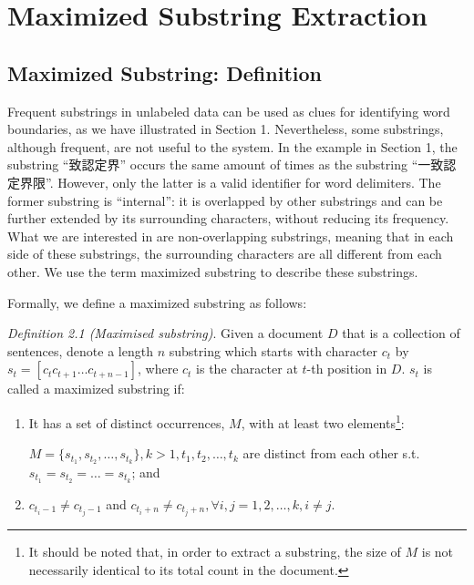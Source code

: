 \documentclass[english]{jnlp_1.4}
\begin{document}
\section{Maximized Substring Extraction}

\subsection{Maximized Substring: Definition}

Frequent substrings in unlabeled data can be used as clues for identifying word boundaries, as we have illustrated in Section 1. Nevertheless, some substrings, although frequent, are not useful to the system. In the example in Section 1, the substring ``致認定界'' occurs the same amount of times as the substring ``一致認定界限''. However, only the latter is a valid identifier for word delimiters. The former substring is ``internal'': it is overlapped by other substrings and can be further extended by its surrounding characters, without reducing its frequency. What we are interested in are non-overlapping substrings, meaning that in each side of these substrings, the surrounding characters are all different from each other. We use the term maximized substring to describe these substrings.

Formally, we define a maximized substring as follows: 

{\it Definition 2.1 (Maximised substring)}. Given a document $D$ that is a collection of sentences, denote a length $\mathit{n}$ substring which starts with character $\mathit{c_{t}}$ by $\mathit{s_{t}}=[\mathit{c_{t}}\mathit{c_{t+1}}\ldots\mathit{c_{t+n-1}}]$, where $\mathit{c_{t}}$ is the character at $t$-th position in $D$. $\mathit{s_{t}}$ is called a maximized substring if:
\begin{enumerate}
\item It has a set of distinct occurrences, $M$, with at least two elements\footnote{It should be noted that, in order to extract a substring, the size of $M$ is not necessarily identical to its total count in the document.}:

$M=\{\mathit{s_{t_1}},\mathit{s_{t_2}},\ldots,\mathit{s_{t_k}}\}, k>1, \mathit{t_1},\mathit{t_2},\ldots,\mathit{t_k}$ are distinct from each other s.t. $\mathit{s_{t_1}}=\mathit{s_{t_2}}=\ldots=\mathit{s_{t_k}}$; and
\item $\mathit{c_{t_i-1}}\neq\mathit{c_{t_j-1}}$ and $\mathit{c_{t_i+n}}\neq\mathit{c_{t_j+n}}, \forall \mathit{i},\mathit{j}=1,2,\ldots,k, \mathit{i}\neq\mathit{j}$.
\end{enumerate}
\end{document}
